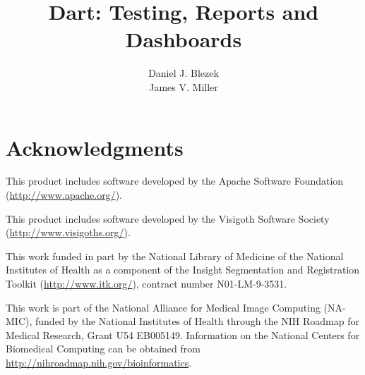 \documentclass{InsightBook}
\begin{document}
\title{Dart: Testing, Reports and Dashboards}
\author{Daniel J. Blezek \\
James V. Miller}
\maketitle


\chapter*{Acknowledgments}
This product includes software developed by the Apache Software Foundation (\url{http://www.apache.org/}).

This product includes software developed by the Visigoth Software Society (\url{http://www.visigoths.org/}).

This work funded in part by the National Library of Medicine of the National Institutes of Health as a component of the Insight Segmentation and Registration Toolkit (\url{http://www.itk.org/}), contract number N01-LM-9-3531.

This work is part of the National Alliance for Medical Image
Computing (NA-MIC), funded by the National Institutes of Health
through the NIH Roadmap for Medical Research, Grant U54 EB005149.
Information on the National Centers for Biomedical Computing
can be obtained from \url{http://nihroadmap.nih.gov/bioinformatics}.

\end{document}
